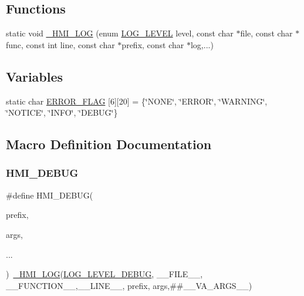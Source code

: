 \subsection*{Functions}
\begin{DoxyCompactItemize}
\item 
static void \hyperlink{hmi-debug_8h_a0846b9d51e2e0612c4825a9a581aa40a}{\+\_\+\+H\+M\+I\+\_\+\+L\+OG} (enum \hyperlink{hmi-debug_8h_aa5a9053636a30269210c54e734e0d583}{L\+O\+G\+\_\+\+L\+E\+V\+EL} level, const char $\ast$file, const char $\ast$func, const int line, const char $\ast$prefix, const char $\ast$log,...)
\end{DoxyCompactItemize}
\subsection*{Variables}
\begin{DoxyCompactItemize}
\item 
static char \hyperlink{hmi-debug_8h_a13d4c7647aad2e84766f8b48a6caab09}{E\+R\+R\+O\+R\+\_\+\+F\+L\+AG} \mbox{[}6\mbox{]}\mbox{[}20\mbox{]} = \{\char`\"{}N\+O\+NE\char`\"{}, \char`\"{}E\+R\+R\+OR\char`\"{}, \char`\"{}W\+A\+R\+N\+I\+NG\char`\"{}, \char`\"{}N\+O\+T\+I\+CE\char`\"{}, \char`\"{}I\+N\+FO\char`\"{}, \char`\"{}D\+E\+B\+UG\char`\"{}\}
\end{DoxyCompactItemize}


\subsection{Macro Definition Documentation}
\mbox{\label{hmi-debug_8h_a0d26d8b8201011dade787236519711c0}} 
\subsubsection{\texorpdfstring{H\+M\+I\+\_\+\+D\+E\+B\+UG}{HMI\_DEBUG}}
{\footnotesize\ttfamily \#define H\+M\+I\+\_\+\+D\+E\+B\+UG(\begin{DoxyParamCaption}\item[{}]{prefix,  }\item[{}]{args,  }\item[{}]{... }\end{DoxyParamCaption})~\hyperlink{hmi-debug_8h_a0846b9d51e2e0612c4825a9a581aa40a}{\+\_\+\+H\+M\+I\+\_\+\+L\+OG}(\hyperlink{hmi-debug_8h_aa5a9053636a30269210c54e734e0d583a538b2b6e011479d408ecd2be0f6d6177}{L\+O\+G\+\_\+\+L\+E\+V\+E\+L\+\_\+\+D\+E\+B\+UG}, \+\_\+\+\_\+\+F\+I\+L\+E\+\_\+\+\_\+, \+\_\+\+\_\+\+F\+U\+N\+C\+T\+I\+O\+N\+\_\+\+\_\+,\+\_\+\+\_\+\+L\+I\+N\+E\+\_\+\+\_\+, prefix, args,\#\#\+\_\+\+\_\+\+V\+A\+\_\+\+A\+R\+G\+S\+\_\+\+\_\+)}



